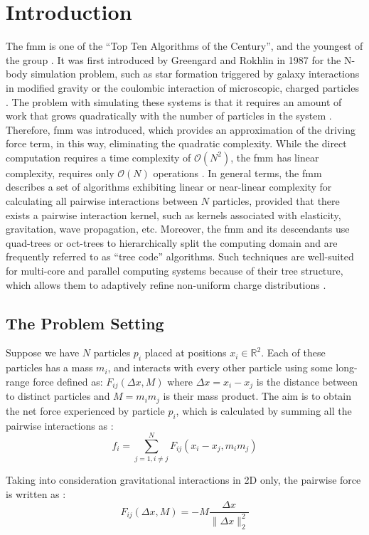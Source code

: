 \section{Introduction} \label{introduction}

The \gls{fmm} is one of the ``Top Ten Algorithms of the  Century'', and the youngest of the group \cite{article}.
It was first introduced by Greengard and Rokhlin in 1987 for the N-body simulation problem, such as star formation triggered by galaxy interactions in modified gravity or the coulombic interaction of microscopic, charged particles \cite{Greengard1987AFA}.
The problem with simulating these systems is that it requires an amount of work that grows quadratically with the number of particles in the system \cite{SicchaSeminar}.
Therefore, \gls{fmm} was introduced, which provides an approximation of the driving force term, in this way, eliminating the quadratic complexity.
While the direct computation requires a time complexity of $\mathcal{O}(N^2)$, the \gls{fmm} has linear complexity, requires only $\mathcal{O}(N)$ operations \cite{Martinsson2015}.
In general terms, the \gls{fmm} describes a set of algorithms exhibiting linear or near-linear complexity for calculating all pairwise interactions between $N$ particles, provided that there exists a pairwise interaction kernel, such as kernels associated with elasticity, gravitation, wave propagation, etc.
Moreover, the \gls{fmm} and its descendants use quad-trees or oct-trees to hierarchically split the computing domain and are frequently referred to as ``tree code'' algorithms.
Such techniques are well-suited for multi-core and parallel computing systems because of their tree structure, which allows them to adaptively refine non-uniform charge distributions \cite{Martinsson2015}.

\subsection{The Problem Setting}

Suppose we have $N$ particles $p_i$ placed at positions $x_i \in \mathbb{R}^2$.
Each of these particles has a mass $m_i$, and interacts with every other particle using some long-range force defined as:
$F_{ij}(\Delta x, M)$ where $\Delta x = x_i - x_j$ is the distance between to distinct particles and $M=m_i m_j$ is their mass product.
The aim is to obtain the net force experienced by particle $p_i$, which is calculated by summing all the pairwise interactions as \cite{SicchaSeminar}:
\begin{equation}
  f_i = \sum_{j=1, i\neq j}^N F_{ij}(x_i - x_j, m_i m_j)
\end{equation}

Taking into consideration gravitational interactions in 2D only, the pairwise force is written as \cite{SicchaSeminar}:
\begin{equation}
  F_{ij}(\Delta x, M) = -M \frac{\Delta x}{\|\Delta x\|_2^2}
\end{equation}

